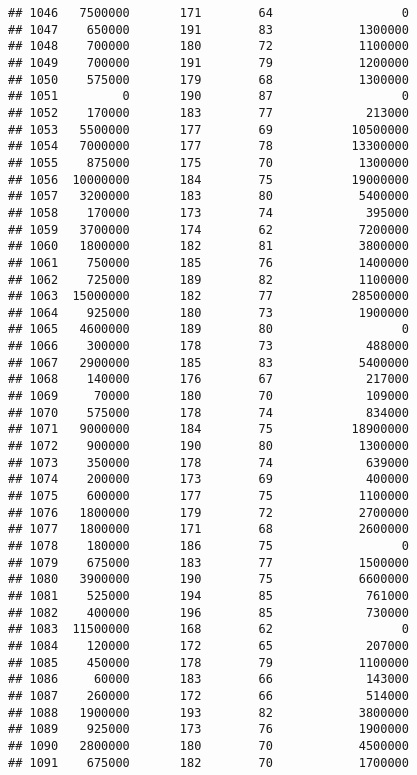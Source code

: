 \documentclass[
]{article}
\begin{document}
\begin{verbatim}
## 1046   7500000       171        64                  0
## 1047    650000       191        83            1300000
## 1048    700000       180        72            1100000
## 1049    700000       191        79            1200000
## 1050    575000       179        68            1300000
## 1051         0       190        87                  0
## 1052    170000       183        77             213000
## 1053   5500000       177        69           10500000
## 1054   7000000       177        78           13300000
## 1055    875000       175        70            1300000
## 1056  10000000       184        75           19000000
## 1057   3200000       183        80            5400000
## 1058    170000       173        74             395000
## 1059   3700000       174        62            7200000
## 1060   1800000       182        81            3800000
## 1061    750000       185        76            1400000
## 1062    725000       189        82            1100000
## 1063  15000000       182        77           28500000
## 1064    925000       180        73            1900000
## 1065   4600000       189        80                  0
## 1066    300000       178        73             488000
## 1067   2900000       185        83            5400000
## 1068    140000       176        67             217000
## 1069     70000       180        70             109000
## 1070    575000       178        74             834000
## 1071   9000000       184        75           18900000
## 1072    900000       190        80            1300000
## 1073    350000       178        74             639000
## 1074    200000       173        69             400000
## 1075    600000       177        75            1100000
## 1076   1800000       179        72            2700000
## 1077   1800000       171        68            2600000
## 1078    180000       186        75                  0
## 1079    675000       183        77            1500000
## 1080   3900000       190        75            6600000
## 1081    525000       194        85             761000
## 1082    400000       196        85             730000
## 1083  11500000       168        62                  0
## 1084    120000       172        65             207000
## 1085    450000       178        79            1100000
## 1086     60000       183        66             143000
## 1087    260000       172        66             514000
## 1088   1900000       193        82            3800000
## 1089    925000       173        76            1900000
## 1090   2800000       180        70            4500000
## 1091    675000       182        70            1700000

\end{verbatim}
\end{document}
